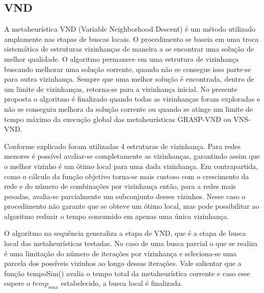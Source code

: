 \documentclass[12pt]{article}
\begin{document}
\subsection{VND}

A metaheurística VND (Variable Neighborhood Descent) é um método utilizado amplamente nas etapas de buscas locais. O procedimento se baseia em uma troca sistemática de estruturas vizinhanças de maneira a se encontrar uma solução de melhor qualidade. O algoritmo permanece em uma estrutura de vizinhança buscando melhorar uma solução corrente, quando não se consegue isso parte-se para outra vizinhança. Sempre que uma melhor solução é encontrada, dentro de um limite de vizinhanças, retorna-se para a vizinhança inicial. No presente proposta o algoritmo é finalizado quando todas as vizinhanças foram exploradas e não se conseguiu melhora da solução corrente ou quando se atinge um limite de tempo máximo da execução global das metaheurísticas GRASP-VND ou VNS-VND.

Conforme explicado foram utilizadas 4 estruturas de vizinhança. Para redes menores é possível avaliar-se completamente as vizinhanças, garantindo assim que o melhor vizinho é um ótimo local para uma dada vizinhança. Em contrapartida, como o cálculo da função objetivo torna-se mais custoso com o crescimento da rede e do número de combinações por vizinhança então, para a redes mais pesadas, avalia-se parcialmente um subconjunto desses vizinhos. Nesse caso o procedimento não garante que se obteve um ótimo local, mas pode possibilitar ao algoritmo reduzir o tempo consumido em apenas uma única vizinhança.

O algoritmo na sequência generaliza a etapa de VND, que é a etapa de busca local das metaheurísticas testadas. No caso de uma busca parcial o que se realiza é uma limitação do número de iterações por vizinhança e seleciona-se uma parcela dos possíveis vizinhos ao longo dessas iterações. Vale salientar que a função tempoSim() avalia o tempo total da metaheurística corrente e caso esse supere o $temp_{max}$ estabelecido, a busca local é finalizada.
\end{document}
